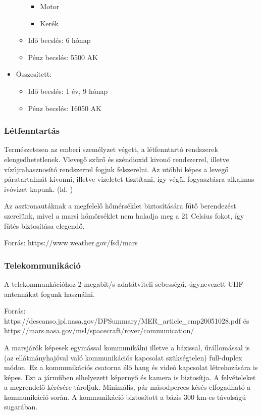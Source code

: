 \documentclass[12pt]{report}
\begin{document}
\begin{itemize}
\begin{itemize}
                \begin{itemize}
                    \item Motor
                    \item Kerék
                \end{itemize}
            \item Idő becslés: 6 hónap
            \item Pénz becslés: 5500 AK
        \end{itemize}
    \item Összesített:
        \begin{itemize}
            \item Idő becslés: 1 év, 9 hónap
            \item Pénz becslés: 16050 AK
        \end{itemize}
\end{itemize}

\subsubsection{Létfenntartás}

Természetesen az emberi személyzet végett, a létfenntartó rendszerek elengedhetetlenek. Vlevegő szűrő és széndioxid kivonó rendszerrel, illetve vízújrahasznosító rendszerrel fogjuk felszerelni. Az utóbbi képes a levegő páratartalmát kivonni, illetve vizeletet tisztítani, így végül fogyasztásra alkalmas ivóvizet kapunk. (ld. )

Az asztronautáknak a megfelelő hőmérséklet biztosítására fűtő berendezést szerelünk, mivel a marsi hőmörséklet nem haladja meg a 21 Celsius fokot, így fűtés biztosítása elegendő.

Forrás: https://www.weather.gov/fsd/mars


\subsubsection{Telekommunikáció}

A telekommunkációhoz 2 megabit/s adatátviteli sebességű, úgynevezett UHF antennákat fogunk használni. 

Forrás: https://descanso.jpl.nasa.gov/DPSummary/MER\_article\_cmp20051028.pdf és https://mars.nasa.gov/msl/spacecraft/rover/communication/

A marsjárók képesek egymással kommunikálni illetve a  bázissal, űrállomással is (az ellátmányhajóval való kommunikációs kapcsolat szükségtelen)  full-duplex módon.  Ez a kommunikációs csatorna élő hang és videó kapcsolat létrehozására is képes. Ezt a járműben elhelyezett képernyő és kamera is biztosítja. A felvételeket a megrendelő kérésére tároljuk. Minimális, pár másodperces késés elfogadható a kommunikáció során.
A kommunikáció biztosított a bázis  300 km-es távolságú sugarában.
\end{document}
